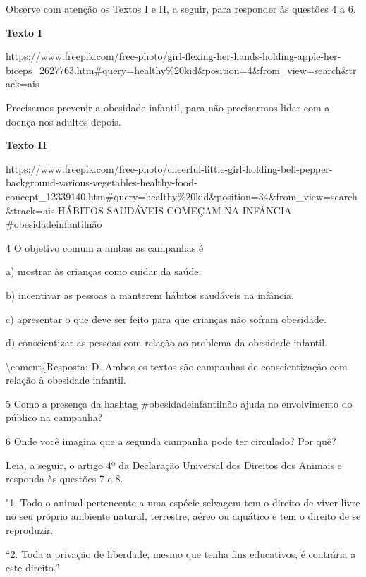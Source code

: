 Observe com atenção os Textos I e II, a seguir, para responder às
questões 4 a 6.

\textbf{Texto I}

https://www.freepik.com/free-photo/girl-flexing-her-hands-holding-apple-her-biceps\_2627763.htm\#query=healthy\%20kid\&position=4\&from\_view=search\&track=ais

Precisamos prevenir a obesidade infantil, para não precisarmos lidar com
a doença nos adultos depois.

\textbf{Texto II}

https://www.freepik.com/free-photo/cheerful-little-girl-holding-bell-pepper-background-various-vegetables-healthy-food-concept\_12339140.htm\#query=healthy\%20kid\&position=34\&from\_view=search\&track=ais
HÁBITOS SAUDÁVEIS COMEÇAM NA INFÂNCIA. \#obesidadeinfantilnão

\num{4} O objetivo comum a ambas as campanhas é

a) mostrar às crianças como cuidar da saúde.

b) incentivar as pessoas a manterem hábitos saudáveis na infância.

c) apresentar o que deve ser feito para que crianças não sofram
obesidade.

d) conscientizar as pessoas com relação ao problema da obesidade
infantil.

\textbackslash coment\{Resposta: D. Ambos os textos são campanhas de
conscientização com relação à obesidade infantil.

\num{5} Como a presença da hashtag \#obesidadeinfantilnão ajuda no
envolvimento do público na campanha?


\num{6} Onde você imagina que a segunda campanha pode ter circulado? Por
quê?


Leia, a seguir, o artigo 4º da Declaração Universal dos Direitos dos
Animais e responda às questões 7 e 8.

"1. Todo o animal pertencente a uma espécie selvagem tem o direito de
viver livre no seu próprio ambiente natural, terrestre, aéreo ou
aquático e tem o direito de se reproduzir.

``2. Toda a privação de liberdade, mesmo que tenha fins educativos, é
contrária a este direito.''

